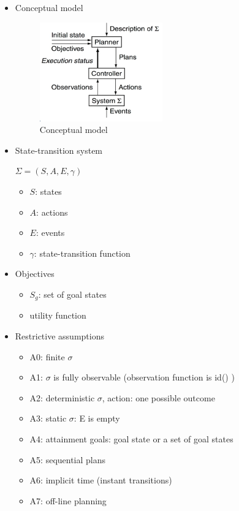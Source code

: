 \begin{itemize}
 \item Conceptual model
  \begin{figure}[h]
    \centering
    \includegraphics{./img/conceptual_model.png}
    \caption{Conceptual model}
  \end{figure}
 
 \item State-transition system
 
	$\Sigma = (S,A,E,\gamma)$
  \begin{itemize}
   \item $S$: states
   \item $A$: actions
   \item $E$: events
   \item $\gamma$: state-transition function
  \end{itemize} 	

 \item Objectives
 \begin{itemize}
  \item $S_g$: set of goal states
  \item utility function
 \end{itemize}
 
 \item Restrictive assumptions
 \begin{itemize}
  \item A0: finite $\sigma$
  \item A1: $\sigma$ is fully observable (observation function is id() )
  \item A2: deterministic $\sigma$, action: one possible outcome
  \item A3: static $\sigma$: E is empty
  \item A4: attainment goals: goal state or a set of goal states
  \item A5: sequential plans
  \item A6: implicit time (instant transitions)
  \item A7: off-line planning
 \end{itemize}
 

\end{itemize}
